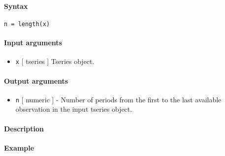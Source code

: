 


	\paragraph{Syntax}\label{syntax}

\begin{verbatim}
n = length(x)
\end{verbatim}

\paragraph{Input arguments}\label{input-arguments}

\begin{itemize}
\itemsep1pt\parskip0pt
\item
  \texttt{x} {[} tseries {]} Tseries object.
\end{itemize}

\paragraph{Output arguments}\label{output-arguments}

\begin{itemize}
\itemsep1pt\parskip0pt
\item
  \texttt{n} {[} numeric {]} - Number of periods from the first to the
  last available observation in the input tseries object.
\end{itemize}

\paragraph{Description}\label{description}

\paragraph{Example}\label{example}



